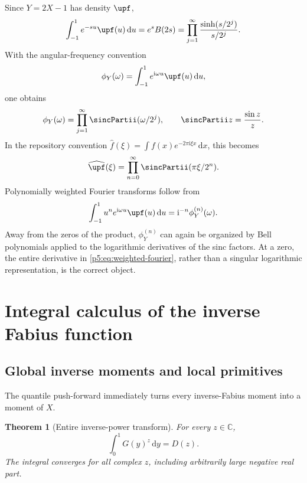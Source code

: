 \documentclass[11pt,oneside]{article}
\newtheorem{theorem}{Theorem}[section]
\theoremstyle{definition}
\theoremstyle{remark}
\newcommand{\C}{\mathbb C}
\newcommand{\dd}{\,\mathrm d}
\newcommand{\ii}{\mathrm i}
\newcommand{\1}{\mathbf 1}
\begin{document}
Since $Y=2X-1$ has density $\upf$,
\begin{equation}\label{p5:eq:bilateral-up-laplace}
 \int_{-1}^{1}e^{-su}\upf(u)\dd u
 =e^sB(2s)
 =\prod_{j=1}^{\infty}
 \frac{\sinh(s/2^j)}{s/2^j}.
\end{equation}
With the angular-frequency convention
\[
 \phi_Y(\omega)=\int_{-1}^{1}e^{\ii\omega u}\upf(u)\dd u,
\]
one obtains
\begin{equation}\label{p5:eq:angular-sinc-product}
 \phi_Y(\omega)=\prod_{j=1}^{\infty}
 \sincPartii(\omega/2^j),
 \qquad \sincPartii z=\frac{\sin z}{z}.
\end{equation}
In the repository convention
$\widehat f(\xi)=\int f(x)e^{-2\pi\ii\xi x}\dd x$,
this becomes
\begin{equation}
 \widehat{\upf}(\xi)=
 \prod_{n=0}^{\infty}\sincPartii(\pi\xi/2^n).
\end{equation}
Polynomially weighted Fourier transforms follow from
\begin{equation}\label{p5:eq:weighted-fourier}
 \int_{-1}^{1}u^ne^{\ii\omega u}\upf(u)\dd u
 =\ii^{-n}\phi_Y^{(n)}(\omega).
\end{equation}
Away from the zeros of the product, $\phi_Y^{(n)}$ can again be organized by Bell polynomials applied to the logarithmic derivatives of the sinc factors.  At a zero, the entire derivative in \eqref{p5:eq:weighted-fourier}, rather than a singular logarithmic representation, is the correct object.

\section{Integral calculus of the inverse Fabius function}

\subsection{Global inverse moments and local primitives}

The quantile push-forward immediately turns every inverse-Fabius moment into a moment of $X$.

\begin{theorem}[Entire inverse-power transform]\label{p5:thm:inverse-entire-moments}
For every $z\in\C$,
\begin{equation}\label{p5:eq:inverse-entire-moments}
 \int_0^1G(y)^z\dd y=D(z).
\end{equation}
The integral converges for all complex $z$, including arbitrarily large negative real part.
\end{theorem}
\end{document}
